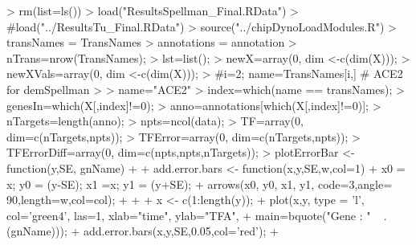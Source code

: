 \documentclass[11pt, a4paper, oneside]{article}
\begin{document}
\begin{Schunk}
\begin{Sinput}
> rm(list=ls())
> load("ResultsSpellman_Final.RData")
> #load("../ResultsTu_Final.RData")
> source("../chipDynoLoadModules.R")
> transNames = TransNames
> annotations = annotation
> nTrans=nrow(TransNames);
> lst=list();
> newX=array(0, dim <-c(dim(X)));
> newXVals=array(0, dim <-c(dim(X)));
> #i=2; name=TransNames[i,] # ACE2 for demSpellman
> 
> name="ACE2"
> index=which(name == transNames);
> genesIn=which(X[,index]!=0);
> anno=annotations[which(X[,index]!=0)];
> nTargets=length(anno);
> npts=ncol(data);
> TF=array(0, dim=c(nTargets,npts));
> TFError=array(0, dim=c(nTargets,npts));
> TFErrorDiff=array(0, dim=c(npts,npts,nTargets));
> plotErrorBar <- function(y,SE, gnName){
+  
+ add.error.bars <- function(x,y,SE,w,col=1){
+  x0 = x; y0 = (y-SE); x1 =x; y1 = (y+SE);
+  arrows(x0, y0, x1, y1, code=3,angle= 90,length=w,col=col);
+  }
+  
+ x <- c(1:length(y));
+ plot(x,y, type = 'l', col='green4', las=1, xlab="time", ylab="TFA", 
+       main=bquote("Gene : " ~ .(gnName)));
+ add.error.bars(x,y,SE,0.05,col='red');
+ }
\end{Sinput}
\end{Schunk}
\end{document}
